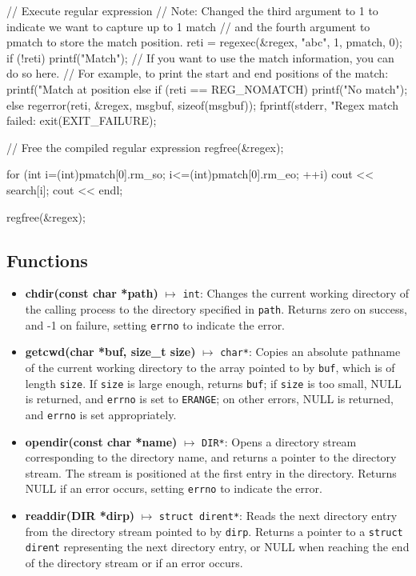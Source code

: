 \documentclass{report}
\begin{document}
    \pagebreak 
    \begin{cppcode}
    // Execute regular expression
    // Note: Changed the third argument to 1 to indicate we want to capture up to 1 match
    // and the fourth argument to pmatch to store the match position.
    reti = regexec(&regex, "abc", 1, pmatch, 0);
    if (!reti) {
        printf("Match\n");
        // If you want to use the match information, you can do so here.
        // For example, to print the start and end positions of the match:
        printf("Match at position %
    }
    else if (reti == REG_NOMATCH) {
        printf("No match\n");
    }
    else {
        regerror(reti, &regex, msgbuf, sizeof(msgbuf));
        fprintf(stderr, "Regex match failed: %
        exit(EXIT_FAILURE);
    }

    // Free the compiled regular expression
    regfree(&regex);

        for (int i=(int)pmatch[0].rm_so; i<=(int)pmatch[0].rm_eo; ++i) {
            cout << search[i];
        }
        cout << endl;

        regfree(&regex);
    \end{cppcode}

    \pagebreak 
    \bigbreak \noindent 
    \subsection{Functions}
    \begin{itemize}
        \item \textbf{chdir(const char *path)} $\mapsto$ \texttt{int}: Changes the current working directory of the calling process to the directory specified in \texttt{path}. Returns zero on success, and -1 on failure, setting \texttt{errno} to indicate the error.
        \item \textbf{getcwd(char *buf, size\_t size)} $\mapsto$ \texttt{char*}: Copies an absolute pathname of the current working directory to the array pointed to by \texttt{buf}, which is of length \texttt{size}. If \texttt{size} is large enough, returns \texttt{buf}; if \texttt{size} is too small, NULL is returned, and \texttt{errno} is set to \texttt{ERANGE}; on other errors, NULL is returned, and \texttt{errno} is set appropriately.
        \item \textbf{opendir(const char *name)} $\mapsto$ \texttt{DIR*}: Opens a directory stream corresponding to the directory name, and returns a pointer to the directory stream. The stream is positioned at the first entry in the directory. Returns NULL if an error occurs, setting \texttt{errno} to indicate the error.
        \item \textbf{readdir(DIR *dirp)} $\mapsto$ \texttt{struct dirent*}: Reads the next directory entry from the directory stream pointed to by \texttt{dirp}. Returns a pointer to a \texttt{struct dirent} representing the next directory entry, or NULL when reaching the end of the directory stream or if an error occurs.
    \end{itemize}
    \bigbreak \noindent 
\end{document}
